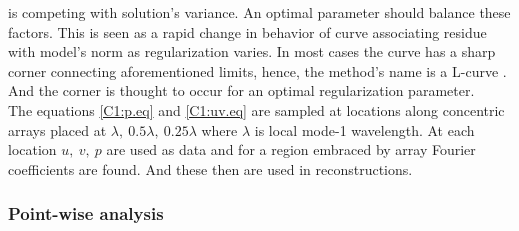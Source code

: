 \documentclass[12pt]{article}
\begin{document}
is competing with solution's variance. An optimal parameter should balance these factors. This is 
seen as a rapid change in behavior of curve associating residue with model's norm as regularization 
varies. In most cases the curve has a sharp corner connecting aforementioned limits, hence, the 
method's name is a L-curve \citep{hansen1999curve}. And the corner is thought to occur for an 
optimal regularization parameter.\\
The equations \eqref{C1:p.eq} and \eqref{C1:uv.eq} are sampled at locations along concentric 
arrays placed at $\lambda,~0.5\lambda,~0.25\lambda$ where $\lambda$ is local mode-1 wavelength. 
At each location $u,~v,~p$ are used as data and for a region embraced by array Fourier coefficients 
are found. And these then are used in reconstructions.
\subsubsection{Point-wise analysis}
\label{C3.app:A2}
\end{document}

